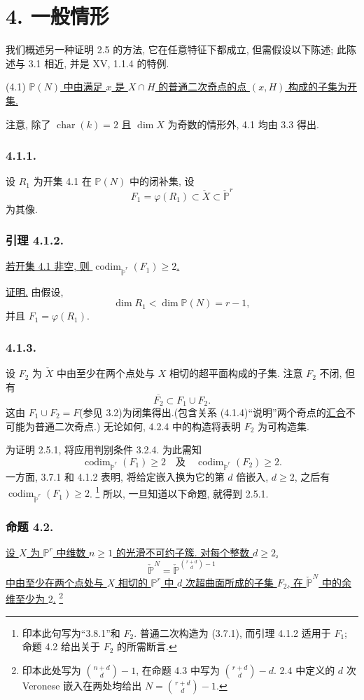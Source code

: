 \section*{4. 一般情形}

我们概述另一种证明 2.5 的方法, 它在任意特征下都成立, 但需假设以下陈述; 此陈述与 3.1 相近, 并是 XV, 1.1.4 的特例.

\medskip
\noindent(4.1) \underline{$\mathbb P(N)$ 中由满足 $x$ 是 $X\cap H$ 的普通二次奇点的点 $(x,H)$ 构成的子集为开集.}

注意, 除了 $\operatorname{char}(k)=2$ 且 $\dim X$ 为奇数的情形外, 4.1 均由 3.3 得出.

\subsubsection*{4.1.1.}
设 $R_1$ 为开集 4.1 在 $\mathbb P(N)$ 中的闭补集, 设
\[
F_1=\varphi(R_1)\subset\check X\subset\check{\mathbb P}^{r}
\]
为其像.

\subsubsection*{引理 4.1.2.}
\underline{若开集 4.1 非空, 则 $\operatorname{codim}_{\check{\mathbb P}^{r}}(F_1)\geq2$.}

\noindent\underline{证明.}
由假设,
\[
\dim R_1<\dim\mathbb P(N)=r-1,
\]
并且 $F_1=\varphi(R_1)$.

\subsubsection*{4.1.3.}
设 $F_2$ 为 $\check X$ 中由至少在两个点处与 $X$ 相切的超平面构成的子集. 注意 $F_2$ 不闭, 但有
\begin{equation}\tag{4.1.4}
\overline{F_2}\subset F_1\cup F_2.
\end{equation}
这由 $F_1\cup F_2=F$(参见 3.2)为闭集得出.(包含关系 (4.1.4)“说明”两个奇点的\underline{汇合}不可能为普通二次奇点.) 无论如何, 4.2.4 中的构造将表明 $F_2$ 为可构造集.

为证明 2.5.1, 将应用判别条件 3.2.4. 为此需知
\[
\operatorname{codim}_{\check{\mathbb P}^{r}}(F_1)\geq2
\quad\text{及}\quad
\operatorname{codim}_{\check{\mathbb P}^{r}}(F_2)\geq2.
\]
一方面, 3.7.1 和 4.1.2 表明, 将给定嵌入换为它的第 $d$ 倍嵌入, $d\geq2$, 之后有 $\operatorname{codim}_{\check{\mathbb P}^{r}}(F_1)\geq2$.
\footnote{印本此句写为“3.8.1”和 $F_2$. 普通二次构造为 (3.7.1), 而引理 4.1.2 适用于 $F_1$; 命题 4.2 给出关于 $F_2$ 的所需断言.}
所以, 一旦知道以下命题, 就得到 2.5.1.

\subsubsection*{命题 4.2.}
\underline{设 $X$ 为 $\mathbb P^r$ 中维数 $n\geq1$ 的光滑不可约子簇. 对每个整数 $d\geq2$,}
\[
\check{\mathbb P}^{N}
=\check{\mathbb P}^{\binom{r+d}{d}-1}
\]
\underline{中由至少在两个点处与 $X$ 相切的 $\mathbb P^r$ 中 $d$ 次超曲面所成的子集 $F_2$, 在 $\check{\mathbb P}^{N}$ 中的余维至少为 $2$.}
\footnote{印本此处写为 $\binom{n+d}{d}-1$, 在命题 4.3 中写为 $\binom{r+d}{d}-d$. 2.4 中定义的 $d$ 次 Veronese 嵌入在两处均给出 $N=\binom{r+d}{d}-1$.}